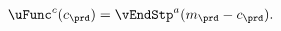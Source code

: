   \begin{equation}\begin{gathered}\begin{aligned}
        \uFunc^{c}(c_{\prd})   & = \vEndStp^{a}(m_{\prd}-c_{\prd}).
        \label{eq:upEqbetaOp}
      \end{aligned}\end{gathered}\end{equation}
